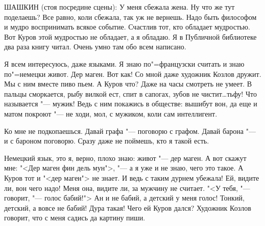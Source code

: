 
ШАШКИН  (стоя посредине сцены):  У  меня
сбежала жена. Ну что же  тут поделаешь?  Все
равно, коли сбежала, так уж не вернешь. Надо
быть философом и мудро  воспринимать  всякое
событие. Счастлив тот,  кто обладает  мудростью. 
Вот Куров этой мудростью  не обладает,
а  я  обладаю.  Я в Публичной библиотеке два
раза  книгу читал. Очень  умно там обо  всем
написано.
    
Я всем интересуюсь, даже языками. Я знаю
по"=французски считать и знаю по"=немецки  живот. Дер маген. Вот как! 
Со мной даже художник  Козлов  дружит.  Мы  с  ним вместе пиво
пьем. А Куров что? Даже на часы  смотреть не
умеет. В пальцы сморкается, рыбу вилкой ест,
спит в сапогах, зубов не чистит\dots тьфу! Что
называется "--- мужик!  Ведь с ним  покажись  в
обществе: вышибут вон, да еще и матом покроют  "---  не ходи, мол, с мужиком, коли сам интеллигент.
    
Ко  мне не подкопаешься.  Давай графа  "---
поговорю с графом. Давай барона  "--- и с бароном 
поговорю. Сразу даже не поймешь,  кто  я
такой есть.
    
Немецкий язык, это я, верно, плохо знаю:
живот "--- дер маген.  А вот  скажут мне:  "<Дер
маген фин дель мун">,  "---  а  я уже и не знаю,
чего это такое. А Куров тот и "<дер маген"> не
знает.  И ведь с таким дурнем  убежала!  Ей,
видите ли, вон чего надо!  Меня она,  видите
ли, за мужчину не считает. "<У тебя, "---  говорит, "--- голос бабий!"> Ан и не бабий,  
а  детский у меня голос!  Тонкий, детский, а вовсе
не бабий!  Дура такая!  Чего ей Куров дался?
Художник  Козлов говорит,  что с меня садись
да картину пиши.
